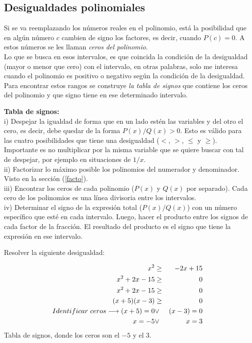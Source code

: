 \subsection{Desigualdades polinomiales}

Si se va reemplazando los números reales en el polinomio, está la posibilidad que en algún número $c$ cambien de signo los factores, es decir, cuando $P(c)=0$. A estos números se les llaman \textit{ceros del polinomio}.\\
Lo que se busca en esos intervalos, es que coincida la condición de la desigualdad (mayor o menor que cero) con el intervalo, en otras palabras, solo me interesa cuando el polinomio es positivo o negativo según la condición de la desigualdad. Para encontrar estos rangos se construye \textit{la tabla de signos} que contiene los ceros del polinomio y que signo tiene en ese determinado intervalo.\\

\begin{mydef}
\textbf{Tabla de signos:}\\

\noindent i) Despejar la igualdad de forma que en un lado estén las variables y del otro el cero, es decir, debe quedar de la forma $P(x)/Q(x)>0$. Esto es válido para las cuatro posibilidades que tiene una desigualdad ($<$, $>$, $\leq$ y $\geq$). Importante es no multiplicar por la misma variable que se quiere buscar con tal de despejar, por ejemplo en situaciones de $1/x$. \\

\noindent ii) Factorizar lo máximo posible los polinomios del numerador y denominador. Visto en la sección (\ref{facto}). \\

\noindent iii) Encontrar los ceros de cada polinomio ($P(x)$ y $Q(x)$ por separado). Cada cero de los polinomios es una línea divisoria entre los intervalos. \\

\noindent iv) Determinar el signo de la expresión total ($P(x)/Q(x)$) con un número específico que esté en cada intervalo. Luego, hacer el producto entre los signos de cada factor de la fracción. El resultado del producto es el signo que tiene la expresión en ese intervalo.\\
\end{mydef}
\newpage
\begin{myexample}
\label{ejem441}
Resolver la siguiente desigualdad:\\
\end{myexample}
\begin{eqnarray*}
x^{2}&\geq & -2x+15 \\
x^{2}+2x-15&\geq & 0\\
x^{2}+2x-15&\geq & 0\\
(x+5)(x-3)&\geq & 0\\
Identificar\hspace{3px} ceros\longrightarrow (x+5)=0 &\vee & (x-3)=0\\
x=-5 &\vee & x=3 \\
\end{eqnarray*}
Tabla de signos, donde los ceros son el $-5$ y el $3$.

